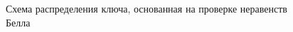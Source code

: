 \begin{figure}
\centering



\caption{Схема распределения ключа, основанная на проверке неравенств Белла}
\label{figPart3QuantInfoCryptoBell}
\end{figure}
